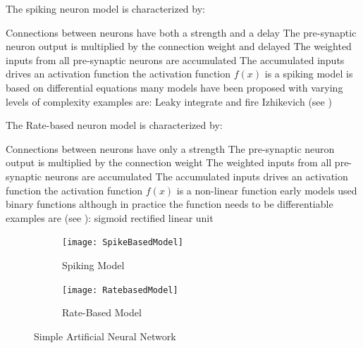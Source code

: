 The spiking neuron model is characterized by:
\begin{outline}
        \1 Connections between neurons have both a strength and a delay
          \2 The pre-synaptic neuron output is multiplied by the connection weight and delayed
        \1 The weighted inputs from all pre-synaptic neurons are accumulated
        \1 The accumulated inputs drives an activation function
          \2 the activation function $f(x)$ is a spiking model is based on differential equations
          \2 many models have been proposed with varying levels of complexity
            \3 examples are:
              \4 Leaky integrate and fire
              \4 Izhikevich \cite{Iz2005} (see )
         
\end{outline}

The Rate-based neuron model is characterized by:
\begin{outline}
        \1 Connections between neurons have only a strength
          \2 The pre-synaptic neuron output is multiplied by the connection weight
        \1 The weighted inputs from all pre-synaptic neurons are accumulated
        \1 The accumulated inputs drives an activation function
          \2 the activation function $f(x)$ is a non-linear function
          \2 early models used binary functions although in practice the function needs to be differentiable
            \3 examples are (see ):
              \4 sigmoid
              \4 rectified linear unit
\end{outline}

\begin{figure}
\centering
\begin{subfigure}{.4\textwidth}
  \centering
  \texttt{[image: SpikeBasedModel]}
  \captionsetup{justification=centering, skip=5pt}
  \caption{Spiking Model}
  \label{fig:simpleNetwork}
\end{subfigure}%
\begin{subfigure}{.4\textwidth}
  \centering
  \texttt{[image: RatebasedModel]}
  \captionsetup{justification=centering, skip=5pt}
  \caption{Rate-Based Model}
  \label{fig:cellContents}
\end{subfigure}
\captionsetup{justification=centering, skip=5pt}
\caption{Simple Artificial Neural Network}
\label{fig:Artificial Neuron Models}
\end{figure}

